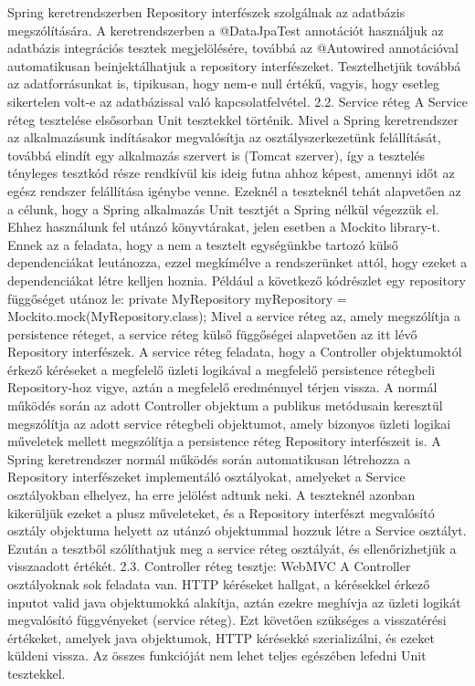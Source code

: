 \documentclass[a4paper, 12 pt]{article}
\begin{document}
Spring keretrendszerben Repository interfészek szolgálnak az adatbázis megszólítására. A keretrendszerben a @DataJpaTest annotációt használjuk az adatbázis integrációs tesztek megjelölésére, továbbá az @Autowired annotációval automatikusan beinjektálhatjuk a repository interfészeket. Tesztelhetjük továbbá az adatforrásunkat is, tipikusan, hogy nem-e null értékű, vagyis, hogy esetleg sikertelen volt-e az adatbázissal való kapcsolatfelvétel.
2.2. Service réteg
A Service réteg tesztelése elsősorban Unit tesztekkel történik. Mivel a Spring keretrendszer az alkalmazásunk indításakor megvalósítja az osztályszerkezetünk felállítását, továbbá elindít egy alkalmazás szervert is (Tomcat szerver), így a tesztelés tényleges tesztkód része rendkívül kis ideig futna ahhoz képest, amennyi időt az egész rendszer felállítása igénybe venne. Ezeknél a teszteknél tehát alapvetően az a célunk, hogy a Spring alkalmazás Unit tesztjét a Spring nélkül végezzük el.
Ehhez használunk fel utánzó könyvtárakat, jelen esetben a Mockito library-t. Ennek az a feladata, hogy a nem a tesztelt egységünkbe tartozó külső dependenciákat leutánozza, ezzel megkímélve a rendszerünket attól, hogy ezeket a dependenciákat létre kelljen hoznia. Például a következő kódrészlet egy repository függőséget utánoz le:
private MyRepository myRepository = Mockito.mock(MyRepository.class);
Mivel a service réteg az, amely megszólítja a persistence réteget, a service réteg külső függőségei alapvetően az itt lévő Repository interfészek. A service réteg feladata, hogy a Controller objektumoktól érkező kéréseket a megfelelő üzleti logikával a megfelelő persistence rétegbeli Repository-hoz vigye, aztán a megfelelő eredménnyel térjen vissza. A normál működés során az adott Controller objektum a publikus metódusain keresztül megszólítja az adott service rétegbeli objektumot, amely bizonyos üzleti logikai műveletek mellett megszólítja a persistence réteg Repository interfészeit is.
A Spring keretrendszer normál működés során automatikusan létrehozza a Repository interfészeket implementáló osztályokat, amelyeket a Service osztályokban elhelyez, ha erre jelölést adtunk neki. A teszteknél azonban kikerüljük ezeket a plusz műveleteket, és a Repository interfészt megvalósító osztály objektuma helyett az utánzó objektummal hozzuk létre a Service osztályt. Ezután a tesztből szólíthatjuk meg a service réteg osztályát, és ellenőrizhetjük a visszaadott értékét.
2.3. Controller réteg tesztje: WebMVC
A Controller osztályoknak sok feladata van. HTTP kéréseket hallgat, a kérésekkel érkező inputot valid java objektumokká alakítja, aztán ezekre meghívja az üzleti logikát megvalósító függvényeket (service réteg). Ezt követően szükséges a visszatérési értékeket, amelyek java objektumok, HTTP kérésekké szerializálni, és ezeket küldeni vissza. Az összes funkcióját nem lehet teljes egészében lefedni Unit tesztekkel.
\end{document}
